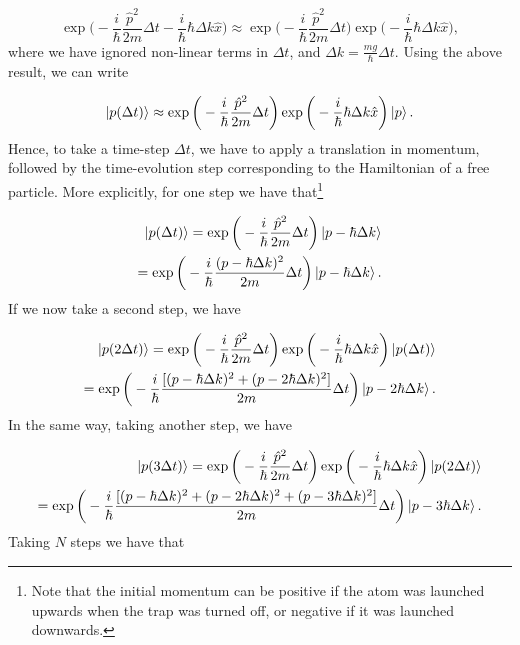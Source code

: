 \documentclass{article}
\begin{document}
\begin{equation}\label{split_operator_formula}
    \exp \bigg(-\frac{i}{\hbar} \frac{\hat{p}^{2}}{2m} \Delta t - \frac{i}{\hbar} \hbar \Delta k \hat{x} \bigg) \approx \exp \bigg( -\frac{i}{\hbar} \frac{\hat{p}^{2}}{2m} \Delta t \bigg) \exp \bigg(- \frac{i}{\hbar} \hbar \Delta k \hat{x} \bigg),
\end{equation}
%
where we have ignored non-linear terms in $\Delta t$, and $\Delta k = \frac{mg}{\hbar} \Delta t$. Using the above result, we can write

\begin{equation}
    \ket{p(\Delta t)} \approx \exp \bigg( -\frac{i}{\hbar} \frac{\hat{p}^{2}}{2m} \Delta t \bigg) \exp \bigg(- \frac{i}{\hbar} \hbar \Delta k \hat{x} \bigg) \ket{p}.
\end{equation}
%
Hence, to take a time-step $\Delta t$, we have to apply a translation in momentum, followed by the time-evolution step corresponding to the Hamiltonian of a free particle. More explicitly, for one step we have that\footnote{Note that the initial momentum can be positive if the atom was launched upwards when the trap was turned off, or negative if it was launched downwards.}

\begin{equation}\label{small_step_momentum_eq}
    \begin{split}
        \ket{p(\Delta t)} = \exp \bigg( -\frac{i}{\hbar} \frac{\hat{p}^{2}}{2m} \Delta t \bigg) \ket{p-\hbar \Delta k} \\ = \exp \bigg( -\frac{i}{\hbar} \frac{(p-\hbar \Delta k)^{2}}{2m} \Delta t \bigg)\ket{p-\hbar \Delta k}.
    \end{split}
\end{equation}
%
If we now take a second step, we have

\begin{equation}
    \begin{split}
        \ket{p(2\Delta t)} = \exp \bigg( -\frac{i}{\hbar} \frac{\hat{p}^{2}}{2m} \Delta t \bigg) \exp \bigg(- \frac{i}{\hbar} \hbar \Delta k \hat{x} \bigg) \ket{p(\Delta t)} \\ = \exp \bigg( -\frac{i}{\hbar} \frac{[(p-\hbar \Delta k)^{2}+(p-2\hbar \Delta k)^{2}]}{2m} \Delta t \bigg) \ket{p - 2 \hbar \Delta k}.
    \end{split}
\end{equation}
%
In the same way, taking another step, we have

\begin{equation}
    \begin{split}
        \ket{p(3\Delta t)} = \exp \bigg( -\frac{i}{\hbar} \frac{\hat{p}^{2}}{2m} \Delta t \bigg) \exp \bigg(- \frac{i}{\hbar} \hbar \Delta k \hat{x} \bigg) \ket{p(2\Delta t)} \\ = \exp \bigg( -\frac{i}{\hbar} \frac{[(p-\hbar \Delta k)^{2}+(p-2\hbar \Delta k)^{2} + (p-3\hbar \Delta k)^{2}]}{2m} \Delta t \bigg) \ket{p - 3 \hbar \Delta k}.
    \end{split}
\end{equation}
%
Taking $N$ steps we have that
\end{document}
